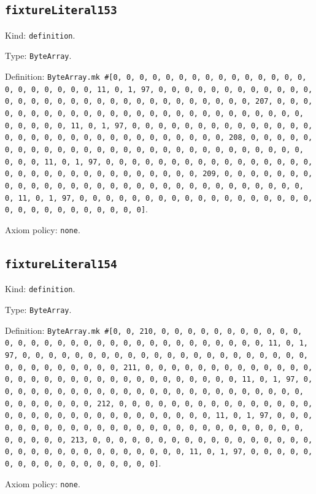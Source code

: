 \documentclass[11pt]{article}
\begin{document}
\subsection*{\texttt{fixtureLiteral153}}
\noindent Kind: \texttt{definition}.\par
\noindent Type: \texttt{ByteArray}.\par
\noindent Definition: \texttt{ByteArray.mk \#[0, 0, 0, 0, 0, 0, 0, 0, 0, 0, 0, 0, 0, 0, 0, 0, 0, 0, 0, 0, 0, 0, 11, 0, 1, 97, 0, 0, 0, 0, 0, 0, 0, 0, 0, 0, 0, 0, 0, 0, 0, 0, 0, 0, 0, 0, 0, 0, 0, 0, 0, 0, 0, 0, 0, 0, 0, 207, 0, 0, 0, 0, 0, 0, 0, 0, 0, 0, 0, 0, 0, 0, 0, 0, 0, 0, 0, 0, 0, 0, 0, 0, 0, 0, 0, 0, 0, 0, 0, 11, 0, 1, 97, 0, 0, 0, 0, 0, 0, 0, 0, 0, 0, 0, 0, 0, 0, 0, 0, 0, 0, 0, 0, 0, 0, 0, 0, 0, 0, 0, 0, 0, 0, 0, 208, 0, 0, 0, 0, 0, 0, 0, 0, 0, 0, 0, 0, 0, 0, 0, 0, 0, 0, 0, 0, 0, 0, 0, 0, 0, 0, 0, 0, 0, 0, 0, 11, 0, 1, 97, 0, 0, 0, 0, 0, 0, 0, 0, 0, 0, 0, 0, 0, 0, 0, 0, 0, 0, 0, 0, 0, 0, 0, 0, 0, 0, 0, 0, 0, 0, 0, 209, 0, 0, 0, 0, 0, 0, 0, 0, 0, 0, 0, 0, 0, 0, 0, 0, 0, 0, 0, 0, 0, 0, 0, 0, 0, 0, 0, 0, 0, 0, 0, 11, 0, 1, 97, 0, 0, 0, 0, 0, 0, 0, 0, 0, 0, 0, 0, 0, 0, 0, 0, 0, 0, 0, 0, 0, 0, 0, 0, 0, 0, 0, 0, 0]}.\par
\noindent Axiom policy: \texttt{none}.\par
\subsection*{\texttt{fixtureLiteral154}}
\noindent Kind: \texttt{definition}.\par
\noindent Type: \texttt{ByteArray}.\par
\noindent Definition: \texttt{ByteArray.mk \#[0, 0, 210, 0, 0, 0, 0, 0, 0, 0, 0, 0, 0, 0, 0, 0, 0, 0, 0, 0, 0, 0, 0, 0, 0, 0, 0, 0, 0, 0, 0, 0, 0, 0, 11, 0, 1, 97, 0, 0, 0, 0, 0, 0, 0, 0, 0, 0, 0, 0, 0, 0, 0, 0, 0, 0, 0, 0, 0, 0, 0, 0, 0, 0, 0, 0, 0, 0, 0, 211, 0, 0, 0, 0, 0, 0, 0, 0, 0, 0, 0, 0, 0, 0, 0, 0, 0, 0, 0, 0, 0, 0, 0, 0, 0, 0, 0, 0, 0, 0, 0, 11, 0, 1, 97, 0, 0, 0, 0, 0, 0, 0, 0, 0, 0, 0, 0, 0, 0, 0, 0, 0, 0, 0, 0, 0, 0, 0, 0, 0, 0, 0, 0, 0, 0, 0, 212, 0, 0, 0, 0, 0, 0, 0, 0, 0, 0, 0, 0, 0, 0, 0, 0, 0, 0, 0, 0, 0, 0, 0, 0, 0, 0, 0, 0, 0, 0, 0, 11, 0, 1, 97, 0, 0, 0, 0, 0, 0, 0, 0, 0, 0, 0, 0, 0, 0, 0, 0, 0, 0, 0, 0, 0, 0, 0, 0, 0, 0, 0, 0, 0, 0, 0, 213, 0, 0, 0, 0, 0, 0, 0, 0, 0, 0, 0, 0, 0, 0, 0, 0, 0, 0, 0, 0, 0, 0, 0, 0, 0, 0, 0, 0, 0, 0, 0, 11, 0, 1, 97, 0, 0, 0, 0, 0, 0, 0, 0, 0, 0, 0, 0, 0, 0, 0, 0, 0]}.\par
\noindent Axiom policy: \texttt{none}.\par
\end{document}
